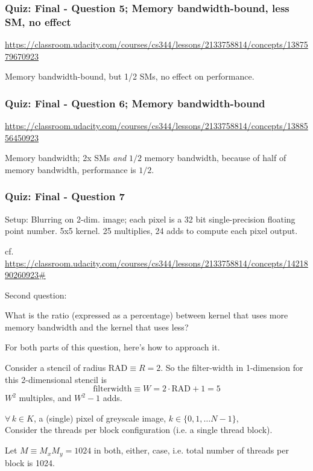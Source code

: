 \documentclass[10pt]{amsart}
\begin{document}
\begin{multicols*}{2}
\subsubsection{Quiz: Final - Question 5; Memory bandwidth-bound, less SM, no effect}

\url{https://classroom.udacity.com/courses/cs344/lessons/2133758814/concepts/1387579670923}

Memory bandwidth-bound, but 1/2 SMs, no effect on performance.  

\subsubsection{Quiz: Final - Question 6; Memory bandwidth-bound}

\url{https://classroom.udacity.com/courses/cs344/lessons/2133758814/concepts/1388556450923}

Memory bandwidth; 2x SMs \emph{and} $1/2$ memory bandwidth, because of half of memory bandwidth, performance is $1/2$.  

\subsubsection{Quiz: Final - Question 7}

Setup: Blurring on 2-dim. image; each pixel is a 32 bit single-precision floating point number.  5x5 kernel.  25 multiplies, 24 adds to compute each pixel output.  

cf. \url{https://classroom.udacity.com/courses/cs344/lessons/2133758814/concepts/1421890260923#}

Second question:

What is the ratio (expressed as a percentage) between kernel that uses more memory bandwidth and the kernel that uses less?

For both parts of this question, here's how to approach it.

Consider a stencil of radius $\text{RAD} \equiv R = 2$.  So the filter-width in 1-dimension for this 2-dimensional stencil is
\[
\text{filterwidth} \equiv W  = 2 \cdot \text{RAD}  +1 = 5
\]
$W^2$ multiples, and $W^2-1$ adds.

$\forall \, k \in K$, a (single) pixel of greyscale image, $k\in \lbrace 0 , 1, \dots N-1 \rbrace$, \\

Consider the threads per block configuration (i.e. a single thread block).

Let $M \equiv M_x M_y = 1024$ in both, either, case, i.e. total number of threads per block is 1024.


\end{multicols*}
\end{document}
